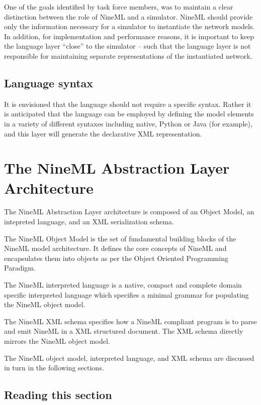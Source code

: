 \documentclass[a4paper]{article}
\begin{document}
One of the goals identified by task force members, was to maintain a
clear distinction between the role of NineML and a simulator. NineML
should provide only the information necessary for a simulator to
instantiate the network models. In addition, for implementation and
performance reasons, it is important to keep the language layer
“close” to the simulator – such that the language layer is not
responsible for maintaining separate representations of the
instantiated network.  

\subsection{Language syntax}

It is envisioned that the language should not require a
specific syntax. Rather it is anticipated that the language can be
employed by defining the model elements in a variety of different
syntaxes including native, Python or Java (for example), and this
layer will generate the declarative XML representation.

\section{The NineML Abstraction Layer Architecture}

The NineML Abstraction Layer architecture is composed of an Object
Model, an intepreted language, and an XML serialization schema.

The NineML Object Model is the set of fundamental building blocks of
the NineML model architecture.  It defines the core concepts of NineML
and encapsulates them into objects as per the Object Oriented
Programming Paradigm.  

The NineML interpreted language is a native, compact and complete
domain specific interpreted language which specifies a minimal grammar for
populating the NineML object model.  

The NineML XML schema specifies how a NineML compliant program is to
parse and emit NineML in a XML structured document.  The XML schema
directly mirrors the NineML object model.

The NineML object model, interpreted language, and XML schema are
discussed in turn in the following sections.

\subsection{Reading this section}
\end{document}
